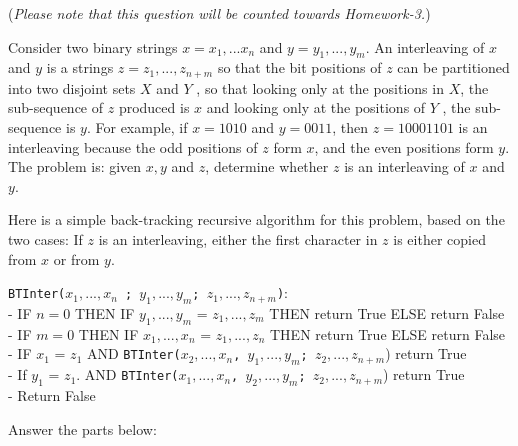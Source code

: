 \documentclass[answers]{exam}
\begin{document}
\begin{questions}
 
\question ({\it Please note that this question will be counted towards Homework-3.})

Consider two binary strings $x = x_1, ... x_n$ and $y = y_1, ..., y_m$. 
An interleaving of $x$ and $y$ is a strings $z = z_1, ..., z_{n+m}$ so that the bit positions of $z$ can be partitioned into two disjoint sets $X$ and $Y$ , so that looking only at the positions in $X$, the sub-sequence of $z$ produced is $x$ and looking only at the positions of $Y$ , the sub-sequence is $y$. 
For example, if $x = 1010$ and $y = 0011$, then $z = 10001101$ is an interleaving because the odd positions of $z$ form $x$, and the even positions form $y$. 
The problem is: given $x,y$ and $z$, determine whether $z$ is an interleaving of $x$ and $y$.

Here is a simple back-tracking recursive algorithm for this problem, based on the two cases:  If $z$ is an interleaving, either the first character in $z$ is either copied from $x$ or from $y$. 


\begin{framed}
{\tt BTInter($x_1, ..., x_n$ ; $y_1, ..., y_m$; $z_1, ..., z_{n+m}$)}:\\
\hspace*{0.1in} - IF $n=0$ THEN IF  $y_1, ..., y_m$ = $z_1, ..., z_m$ THEN return True ELSE return False\\
\hspace*{0.1in} - IF $m=0$ THEN IF $x_1, ..., x_n$ = $z_1, ..., z_n$ THEN return True ELSE return False\\
\hspace*{0.1in} - IF $x_1$ = $z_1$ AND {\tt BTInter($x_2, ..., x_n$, $y_1, ..., y_m$; $z_2, ..., z_{n+m}$}) return True\\
\hspace*{0.1in} - If $y_1$ = $z_1$.  AND {\tt BTInter($x_1, ..., x_n$, $y_2, ..., y_m$; $z_2, ..., z_{n+m}$}) return True\\
\hspace*{0.1in} - Return False 
\end{framed}

Answer the parts below:
\begin{parts}

\end{parts}
\end{questions}
\end{document}
